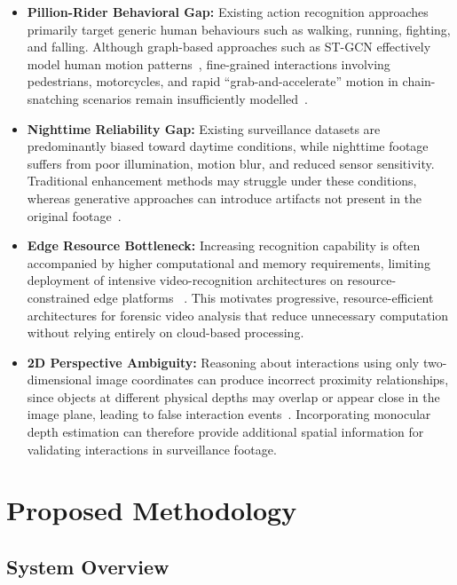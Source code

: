 \documentclass[runningheads]{llncs}
\begin{document}
\begin{itemize}
\item \textbf{Pillion-Rider Behavioral Gap:} Existing action recognition
approaches primarily target generic human behaviours such as walking,
running, fighting, and falling. Although graph-based approaches such as
ST-GCN effectively model human motion patterns~\cite{yan2018stgcn},
fine-grained interactions involving pedestrians, motorcycles, and rapid
``grab-and-accelerate'' motion in chain-snatching scenarios remain
insufficiently modelled~\cite{roy2018snatch}.

\item \textbf{Nighttime Reliability Gap:} Existing surveillance datasets
are predominantly biased toward daytime conditions, while nighttime
footage suffers from poor illumination, motion blur, and reduced sensor
sensitivity. Traditional enhancement methods may struggle under these
conditions, whereas generative approaches can introduce artifacts not
present in the original footage~\cite{lime,enlightengan,zerodce,retinexnet}.

\item \textbf{Edge Resource Bottleneck:} Increasing recognition
capability is often accompanied by higher computational and memory
requirements, limiting deployment of intensive video-recognition
architectures on resource-constrained edge platforms
~\cite{liu2022video,feichtenhofer2019slowfast}. This motivates
progressive, resource-efficient architectures for forensic video
analysis that reduce unnecessary computation without relying entirely
on cloud-based processing.

\item \textbf{2D Perspective Ambiguity:} Reasoning about interactions
using only two-dimensional image coordinates can produce incorrect
proximity relationships, since objects at different physical depths may
overlap or appear close in the image plane, leading to false
interaction events~\cite{monovit,yang2024depth}. Incorporating monocular
depth estimation can therefore provide additional spatial information
for validating interactions in surveillance footage.
\end{itemize}

\section{Proposed Methodology}
\label{sec:methodology}

\subsection{System Overview}
\end{document}
